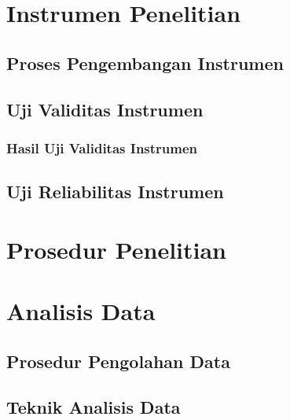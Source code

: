 \documentclass{book}
\begin{document}
\section{Instrumen Penelitian}
\subsection{Proses Pengembangan Instrumen}
\subsection{Uji Validitas Instrumen}
\subsubsection{Hasil Uji Validitas Instrumen}

\subsection{Uji Reliabilitas Instrumen}

\section{Prosedur Penelitian}

\section{Analisis Data}
\subsection{Prosedur Pengolahan Data}
\subsection{Teknik Analisis Data}
\end{document}
